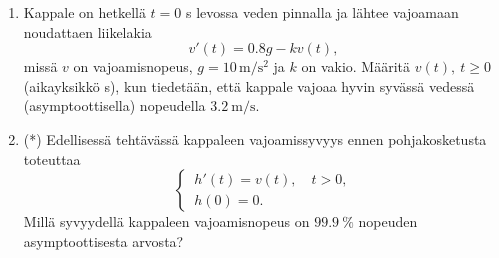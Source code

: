 \begin{enumerate}
\item
Kappale on hetkellä $t=0$ s levossa veden pinnalla ja lähtee vajoamaan noudattaen liikelakia
\[
v'(t)=0.8g-kv(t),
\]
missä $v$ on vajoamisnopeus, $g=10\,\text{m}/\text{s}^2$ ja $k$ on vakio. Määritä
$v(t),\ t \ge 0$ (aikayksikkö s), kun tiedetään, että kappale vajoaa hyvin syvässä 
vedessä (asymptoottisella) nopeudella  $3.2\ \text{m}/\text{s}$.

\item (*) Edellisessä tehtävässä kappaleen vajoamissyvyys ennen pohjakosketusta toteuttaa
\[
\begin{cases} \,h'(t) = v(t), \quad t>0, \\ \,h(0)=0. \end{cases}
\]
Millä syvyydellä kappaleen vajoamisnopeus on $99.9\ \%$ nopeuden asymptoottisesta arvosta?

\end{enumerate}
